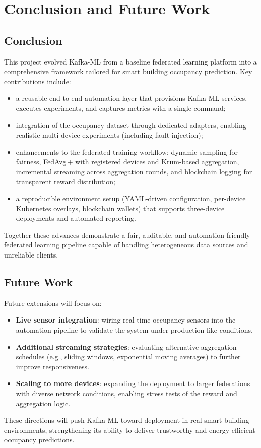\chapter{Conclusion and Future Work}

\section{Conclusion}

This project evolved Kafka-ML from a baseline federated learning platform into a comprehensive framework tailored for smart building occupancy prediction. Key contributions include:

\begin{itemize}
    \item a reusable end-to-end automation layer that provisions Kafka-ML services, executes experiments, and captures metrics with a single command;
    \item integration of the occupancy dataset through dedicated adapters, enabling realistic multi-device experiments (including fault injection);
    \item enhancements to the federated training workflow: dynamic sampling for fairness, FedAvg\,+ with registered devices and Krum-based aggregation, incremental streaming across aggregation rounds, and blockchain logging for transparent reward distribution;
    \item a reproducible environment setup (YAML-driven configuration, per-device Kubernetes overlays, blockchain wallets) that supports three-device deployments and automated reporting.
\end{itemize}

Together these advances demonstrate a fair, auditable, and automation-friendly federated learning pipeline capable of handling heterogeneous data sources and unreliable clients.

\section{Future Work}

Future extensions will focus on:

\begin{itemize}
    \item \textbf{Live sensor integration}: wiring real-time occupancy sensors into the automation pipeline to validate the system under production-like conditions.
    \item \textbf{Additional streaming strategies}: evaluating alternative aggregation schedules (e.g., sliding windows, exponential moving averages) to further improve responsiveness.
    \item \textbf{Scaling to more devices}: expanding the deployment to larger federations with diverse network conditions, enabling stress tests of the reward and aggregation logic.
\end{itemize}

These directions will push Kafka-ML toward deployment in real smart-building environments, strengthening its ability to deliver trustworthy and energy-efficient occupancy predictions.
